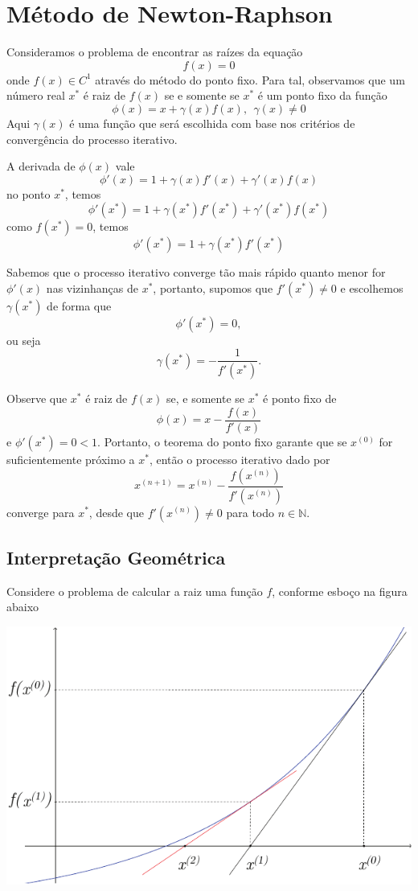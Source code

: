 \documentclass[main.tex]{subfiles}
\begin{document}
\section{Método de Newton-Raphson}

Consideramos o problema de encontrar as raízes da equação
$$f(x)=0$$ onde $f(x)\in C^1$ através do método do ponto fixo.
Para tal, observamos que um número real $x^*$ é raiz de $f(x)$ se e somente se $x^*$ é um ponto fixo da função
$$\phi(x)=x+\gamma(x)f(x), ~~\gamma(x)\neq 0$$
Aqui $\gamma(x)$ é uma função que será escolhida com base nos critérios de convergência do processo iterativo.


A derivada de $\phi(x)$ vale
$$\phi'(x)=1+\gamma(x)f'(x)+\gamma'(x)f(x)$$
no ponto $x^*$, temos
$$\phi'(x^*)=1+\gamma(x^*)f'(x^*)+\gamma'(x^*)f(x^*)$$
como $f(x^*)=0$, temos
$$\phi'(x^*)=1+\gamma(x^*)f'(x^*)$$

Sabemos que o processo iterativo converge tão mais rápido quanto menor for $\phi'(x)$ nas  vizinhanças de $x^*$, portanto, supomos que $f'(x^*)\neq 0$ e escolhemos $\gamma(x^*)$ de forma que
$$\phi'(x^*)=0,$$ ou seja
$$\gamma(x^*)=-\frac{1}{f'(x^*)}.$$

Observe que $x^*$ é raiz de $f(x)$ se, e somente se $x^*$ é ponto fixo de
$$\phi(x)=x-\frac{f(x)}{f'(x)}$$
e $\phi'(x^*)=0<1$. Portanto, o teorema do ponto fixo garante que se $x^{(0)}$ for suficientemente próximo a $x^*$, então o processo iterativo dado por
$$x^{(n+1)}=x^{(n)}-\frac{f(x^{(n)})}{f'(x^{(n)})}$$
converge para $x^*$, desde que $f'(x^{(n)})\neq 0 $ para todo $n\in\mathbb{N}$.

\subsection{Interpretação Geométrica}

Considere o problema de calcular a raiz uma função $f$, conforme esboço na figura abaixo

\begin{center}
\includegraphics[scale=.4]{./cap_equacao1d/pics/fig_Newton}
\end{center}
\end{document}
